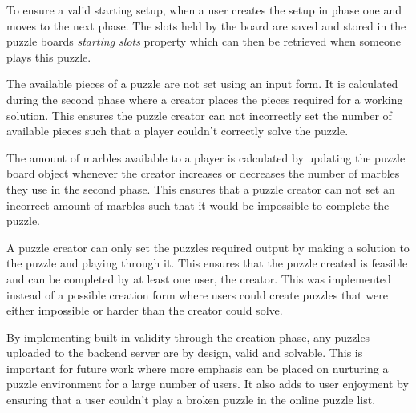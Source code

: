 \documentclass{l4proj}
\begin{document}
To ensure a valid starting setup, when a user creates the setup in phase one and moves to the next phase. The slots held by the board are saved and stored in the puzzle boards \emph{starting slots} property which can then be retrieved when someone plays this puzzle. 

The available pieces of a puzzle are not set using an input form. It is calculated during the second phase where a creator places the pieces required for a working solution. This ensures the puzzle creator can not incorrectly set the number of available pieces such that a player couldn't correctly solve the puzzle. 

The amount of marbles available to a player is calculated by updating the puzzle board object whenever the creator increases or decreases the number of marbles they use in the second phase. This ensures that a puzzle creator can not set an incorrect amount of marbles such that it would be impossible to complete the puzzle. 

A puzzle creator can only set the puzzles required output by making a solution to the puzzle and playing through it. This ensures that the puzzle created is feasible and can be completed by at least one user, the creator. This was implemented instead of a possible creation form where users could create puzzles that were either impossible or harder than the creator could solve.

By implementing built in validity through the creation phase, any puzzles uploaded to the backend server are by design, valid and solvable. This is important for future work where more emphasis can be placed on nurturing a puzzle environment for a large number of users. It also adds to user enjoyment by ensuring that a user couldn't play a broken puzzle in the online puzzle list.

\end{document}

